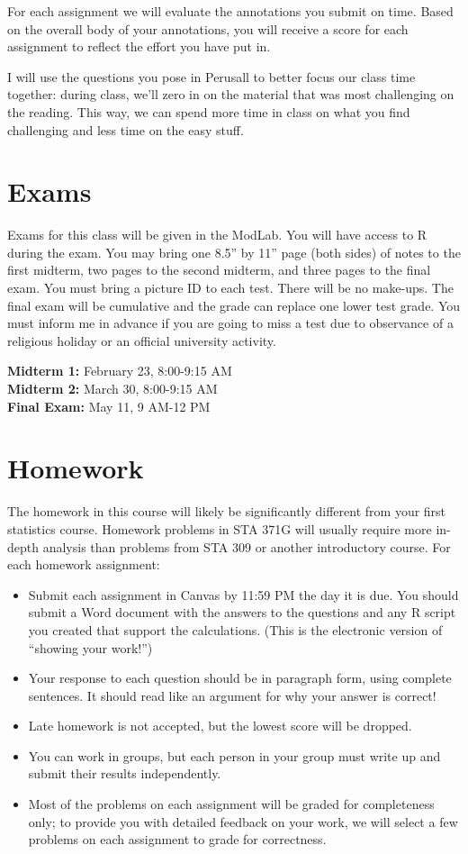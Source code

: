 \documentclass[12pt]{article}
\begin{document}
For each assignment we will evaluate the annotations you submit on time. Based on the overall body of your annotations, you will receive a score for each assignment to reflect the effort you have put in.

I will use the questions you pose in Perusall to better focus our class time together: during class, we'll zero in on the material that was most challenging on the reading.  This way, we can spend more time in class on what you find challenging and less time on the easy stuff.

\section*{Exams}

Exams for this class will be given in the ModLab.  You will have access to R during the exam.  You may bring one 8.5'' by 11'' page (both sides) of notes to the first midterm, two pages to the second midterm, and three pages to the final exam.  You must bring a picture ID to each test.  There will be no make-ups.  The final exam will be cumulative and the grade can replace one lower test grade.  You must inform me in advance if you are going to miss a test due to observance of a religious holiday or an official university activity.

\textbf{Midterm 1:} February 23, 8:00-9:15 AM  \\
\textbf{Midterm 2:} March 30, 8:00-9:15 AM  \\
\textbf{Final Exam:} May 11, 9 AM-12 PM \\

\section*{Homework}

The homework in this course will likely be significantly different from your first statistics course.  Homework problems in STA 371G will usually require more in-depth analysis than problems from STA 309 or another introductory course.  For each homework assignment:
\begin{itemize}
\item Submit each assignment in Canvas by 11:59 PM the day it is due.  You should submit a Word document with the answers to the questions and any R script you created that support the calculations.  (This is the electronic version of ``showing your work!'')
\item Your response to each question should be in paragraph form, using complete sentences.  It should read like an argument for why your answer is correct!
\item Late homework is not accepted, but the lowest score will be dropped.  
\item You can work in groups, but each person in your group must write up and submit their results independently.
\item Most of the problems on each assignment will be graded for completeness only; to provide you with detailed feedback on your work, we will select a few problems on each assignment to grade for correctness.
\end{itemize}
\end{document}
